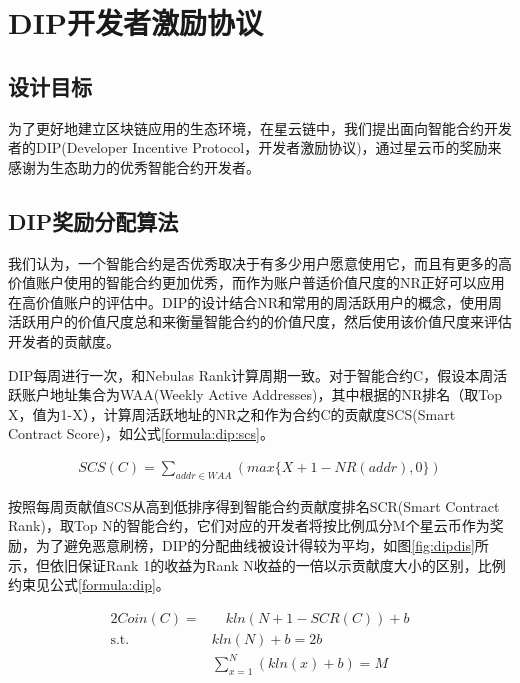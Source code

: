 \section{DIP开发者激励协议}
\label{sec:dip}

\subsection{设计目标}
\label{dip:design}
为了更好地建立区块链应用的生态环境，在星云链中，我们提出面向智能合约开发者的DIP(Developer Incentive Protocol，开发者激励协议)，通过星云币的奖励来感谢为生态助力的优秀智能合约开发者。

\subsection{DIP奖励分配算法}
\label{dip:arith}
我们认为，一个智能合约是否优秀取决于有多少用户愿意使用它，而且有更多的高价值账户使用的智能合约更加优秀，而作为账户普适价值尺度的NR正好可以应用在高价值账户的评估中。DIP的设计结合NR和常用的周活跃用户的概念，使用周活跃用户的价值尺度总和来衡量智能合约的价值尺度，然后使用该价值尺度来评估开发者的贡献度。

DIP每周进行一次，和Nebulas Rank计算周期一致。对于智能合约C，假设本周活跃账户地址集合为WAA(Weekly Active Addresses)，其中根据的NR排名（取Top X，值为1-X），计算周活跃地址的NR之和作为合约C的贡献度SCS(Smart Contract Score)，如公式\ref{formula:dip:scs}。

\begin{align}
\label{formula:dip:scs}
SCS(C)=\sum_{addr \in WAA}(max\{X + 1 - NR(addr), 0\})
\end{align}

按照每周贡献值SCS从高到低排序得到智能合约贡献度排名SCR(Smart Contract Rank)，取Top N的智能合约，它们对应的开发者将按比例瓜分M个星云币作为奖励，为了避免恶意刷榜，DIP的分配曲线被设计得较为平均，如图\ref{fig:dipdis}所示，但依旧保证Rank 1的收益为Rank N收益的一倍以示贡献度大小的区别，比例约束见公式\ref{formula:dip}。

\begin{alignat}{2}
Coin(C) = & \quad kln(N+1-SCR(C))+b \label{formula:dip} \\
\mbox{s.t.}\quad & kln(N) + b = 2b \nonumber \\
& \sum_{x=1}^{N}(kln(x) + b) = M \nonumber
\end{alignat}

